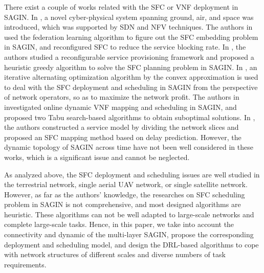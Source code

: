 There exist a couple of works related with the SFC or VNF deployment in SAGIN. In \cite{AKYILDIZ2019134}, a novel cyber-physical system spanning ground, air, and space was introduced, which was supported by SDN and NFV techniques. The authors in \cite{9951143} used the federation learning algorithm to figure out the SFC embedding problem in SAGIN, and reconfigured SFC to reduce the service blocking rate. In \cite{9062531}, the authors studied a reconfigurable service provisioning framework and proposed a heuristic greedy algorithm to solve the SFC planning problem in SAGIN. In \cite{10207691}, an iterative alternating optimization algorithm by the convex approximation is used to deal with the SFC deployment and scheduling in SAGIN from the perspective of network operators, so as to maximize the network profit. The authors in \cite{9351537} investigated online dynamic VNF mapping and scheduling in SAGIN, and proposed two Tabu search-based algorithms to obtain suboptimal solutions. In \cite{9749937}, the authors constructed a service model by dividing the network slices and proposed an SFC mapping method based on delay prediction. However, the dynamic topology of SAGIN across time have not been well considered in these works, which is a significant issue and cannot be neglected.

As analyzed above, the SFC deployment and scheduling issues are well studied in the terrestrial network, single aerial UAV network, or single satellite network. However, as far as the authors' knowledge, the researches on SFC scheduling problem in SAGIN is not comprehensive, and most designed algorithms are heuristic. These algorithms can not be well adapted to large-scale networks and complete large-scale tasks. Hence, in this paper, we take into account the connectivity and dynamic of the multi-layer SAGIN, propose the corresponding deployment and scheduling model, and design the DRL-based algorithms to cope with network structures of different scales and diverse numbers of task requirements.